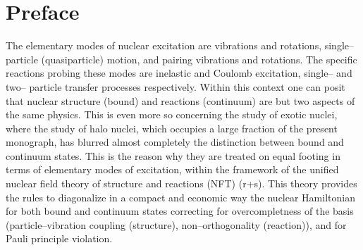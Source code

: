  \chapter*{Preface}
The elementary modes of nuclear excitation are vibrations and rotations, single--particle (quasiparticle)  motion, and pairing vibrations and rotations. The specific reactions probing these modes are inelastic and Coulomb excitation,  single-- and two-- particle transfer processes respectively. Within this context one can posit that nuclear structure (bound) and reactions (continuum) are but two aspects of the same physics. This is even more so concerning the study of exotic nuclei, where the study of halo nuclei, which occupies a large fraction of the present monograph, has blurred almost completely the distinction between bound and continuum states. This is the reason why they are treated on equal footing in terms of elementary modes of excitation, within the framework of the unified nuclear field theory of structure and reactions (NFT) (r+s). This theory provides the rules to diagonalize in a compact and economic way the nuclear Hamiltonian for both bound and continuum states correcting for overcompletness of the basis (particle--vibration coupling (structure), non--orthogonality (reaction)), and for Pauli principle violation. 

